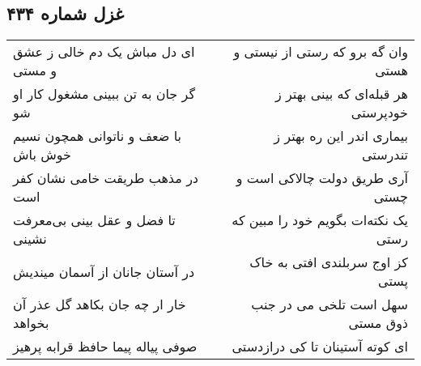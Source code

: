 \begin{center}
\section*{غزل شماره ۴۳۴}
\label{sec:sh434}
\begin{longtable}{l p{0.5cm} r}
ای دل مباش یک دم خالی ز عشق و مستی
&&
وان گه برو که رستی از نیستی و هستی
\\
گر جان به تن ببینی مشغول کار او شو
&&
هر قبله‌ای که بینی بهتر ز خودپرستی
\\
با ضعف و ناتوانی همچون نسیم خوش باش
&&
بیماری اندر این ره بهتر ز تندرستی
\\
در مذهب طریقت خامی نشان کفر است
&&
آری طریق دولت چالاکی است و چستی
\\
تا فضل و عقل بینی بی‌معرفت نشینی
&&
یک نکته‌ات بگویم خود را مبین که رستی
\\
در آستان جانان از آسمان میندیش
&&
کز اوج سربلندی افتی به خاک پستی
\\
خار ار چه جان بکاهد گل عذر آن بخواهد
&&
سهل است تلخی می در جنب ذوق مستی
\\
صوفی پیاله پیما حافظ قرابه پرهیز
&&
ای کوته آستینان تا کی درازدستی
\\
\end{longtable}
\end{center}
